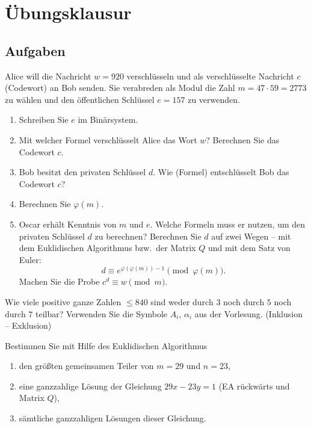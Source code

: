 \providecommand{\teil}[1]{\par\medskip\textbf{#1)}\ }

\section{Übungsklausur}
\subsection{Aufgaben}

\begin{aufgabe}[Aufgabe 1]
Alice will die Nachricht $w = 920$ verschlüsseln und als verschlüsselte Nachricht $c$ (Codewort)
an Bob senden. Sie verabreden als Modul die Zahl $m = 47 \cdot 59 = 2773$ zu wählen und den
öffentlichen Schlüssel $e = 157$ zu verwenden.
\begin{enumerate}[label=\alph*)]
  \item Schreiben Sie $e$ im Binärsystem.
  \item Mit welcher Formel verschlüsselt Alice das Wort $w$? Berechnen Sie das Codewort $c$.
  \item Bob besitzt den privaten Schlüssel $d$. Wie (Formel) entschlüsselt Bob das Codewort $c$?
  \item Berechnen Sie $\varphi(m)$.
  \item Oscar erhält Kenntnis von $m$ und $e$. Welche Formeln muss er nutzen, um den privaten
        Schlüssel $d$ zu berechnen? Berechnen Sie $d$ auf zwei Wegen
        -- mit dem Euklidischen Algorithmus bzw.\ der Matrix $Q$ und mit dem Satz von Euler:
        \[ d \equiv e^{\varphi(\varphi(m)) - 1} \pmod{\varphi(m)} . \]
        Machen Sie die Probe $c^d \equiv w \pmod m$.
\end{enumerate}
\end{aufgabe}

\begin{aufgabe}[Aufgabe 2]
Wie viele positive ganze Zahlen $\leq 840$ sind weder durch $3$ noch durch $5$ noch durch $7$ teilbar?
Verwenden Sie die Symbole $A_i$, $\alpha_i$ aus der Vorlesung. (Inklusion -- Exklusion)
\end{aufgabe}

\begin{aufgabe}[Aufgabe 3]
Bestimmen Sie mit Hilfe des Euklidischen Algorithmus
\begin{enumerate}[label=\alph*)]
  \item den größten gemeinsamen Teiler von $m = 29$ und $n = 23$,
  \item eine ganzzahlige Lösung der Gleichung $29x - 23y = 1$ (EA rückwärts und Matrix $Q$),
  \item sämtliche ganzzahligen Lösungen dieser Gleichung.
\end{enumerate}
\end{aufgabe}

